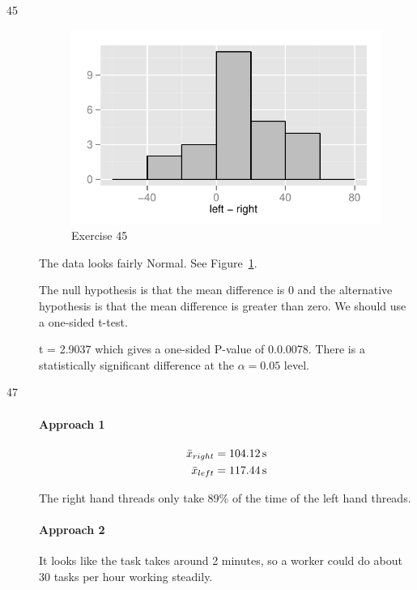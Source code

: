\documentclass[letterpaper]{exam}
\begin{document}
\begin{description}
      \item[45]
        \begin{figure}[H]
          \centering
          \includegraphics[scale = 1.0]{figures/ex45.pdf}
          \caption{Exercise 45}\label{fig:ex45}
        \end{figure}

        The data looks fairly Normal. See Figure~\ref{fig:ex45}.

        The null hypothesis is that the mean difference is 0 and the alternative
        hypothesis is that the mean difference is greater than zero. We should
        use a one-sided t-test.

        t = 2.9037 which gives a one-sided P-value of 0.0.0078. There is a
        statistically significant difference at the $\alpha = 0.05$ level.
        
      \item[47]

        \paragraph{Approach 1}

        \begin{align*}
          \bar{x}_{right} &= \unit[104.12]{s} \\
          \bar{x}_{left} &= \unit[117.44]{s} \\
        \end{align*}

        The right hand threads only take 89\% of the time of the left hand
        threads.

        \paragraph{Approach 2}
        It looks like the task takes around 2 minutes, so a worker could do
        about 30 tasks per hour working steadily. 


\end{description}
\end{document}

